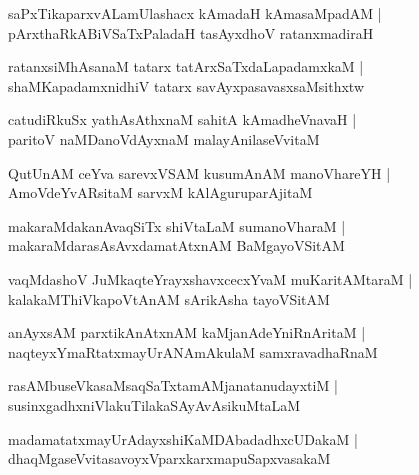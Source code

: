\documentclass[twoside,12pt,openright]{book}
\newcounter{shloka}[chapter]
\begin{document}
\begin{shloka}%
saPxTikaparxvALamUlashacx kAmadaH kAmasaMpadAM |\\
pArxthaRkABiVSaTxPaladaH tasAyxdhoV ratanxmadiraH
\end{shloka}

\begin{shloka}%
ratanxsiMhAsanaM tatarx tatArxSaTxdaLapadamxkaM |\\
shaMKapadamxnidhiV tatarx savAyxpasavasxsaMsithxtw
\end{shloka}

\begin{shloka}%
catudiRkuSx yathAsAthxnaM sahitA kAmadheVnavaH |\\
paritoV naMDanoVdAyxnaM malayAnilaseVvitaM 
\end{shloka}

\begin{shloka}%
QutUnAM ceYva sarevxVSAM kusumAnAM manoVhareYH |\\
AmoVdeYvARsitaM sarvxM kAlAguruparAjitaM 
\end{shloka}

\begin{shloka}%
makaraMdakanAvaqSiTx shiVtaLaM sumanoVharaM |\\
makaraMdarasAsAvxdamatAtxnAM BaMgayoVSitAM 
\end{shloka}

\begin{shloka}%
vaqMdashoV JuMkaqteYrayxshavxcecxYvaM muKaritAMtaraM |\\
kalakaMThiVkapoVtAnAM sArikAsha tayoVSitAM 
\end{shloka}

\begin{shloka}%
anAyxsAM parxtikAnAtxnAM kaMjanAdeYniRnAritaM |\\
naqteyxYmaRtatxmayUrANAmAkulaM samxravadhaRnaM 
\end{shloka}

\begin{shloka}%
rasAMbuseVkasaMsaqSaTxtamAMjanatanudayxtiM |\\
susinxgadhxniVlakuTilakaSAyAvAsikuMtaLaM
\end{shloka}

\begin{shloka}%
madamatatxmayUrAdayxshiKaMDAbadadhxcUDakaM |\\
dhaqMgaseVvitasavoyxVparxkarxmapuSapxvasakaM 
\end{shloka}
\end{document}
